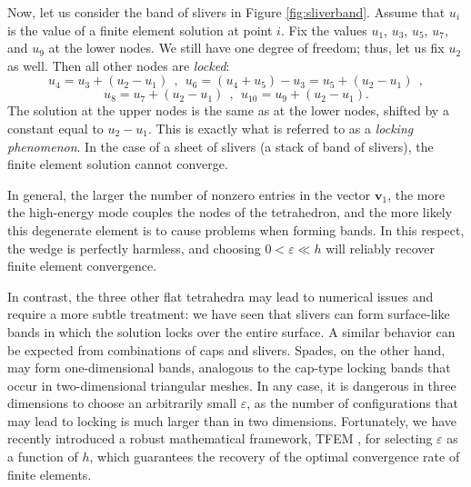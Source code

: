 \documentclass{article}
\begin{document}
Now, let us consider the band of slivers in Figure \ref{fig:sliverband}. Assume that $u_i$ is the value of a finite element solution at point $i$. Fix the values $u_1$, $u_3$, $u_5$, $u_7$, and $u_9$ at the lower nodes. We still have one degree of freedom; thus, let us fix $u_2$ as well. Then all other nodes are \emph{locked}:
$$u_4 = u_3+(u_2-u_1)~~,~~u_6 = (u_4+u_5)-u_3=u_5+(u_2-u_1)~~,$$
$$u_8 = u_7+(u_2-u_1)~~,~~u_{10} = u_9+(u_2-u_1).$$
The solution at the upper nodes is the same as at the lower nodes, shifted by a constant equal to $u_2-u_1$. This is exactly what is referred to as a \emph{locking phenomenon}. In the case of a sheet of slivers (a stack of band of slivers), the finite element solution cannot converge.

In general, the larger the number of nonzero entries in the vector \(\boldsymbol{v}_1\), 
the more the high-energy mode couples the nodes of the tetrahedron, 
and the more likely this degenerate element is to cause problems when forming bands. 
In this respect, the wedge is perfectly harmless, 
and choosing \(0 < \varepsilon \ll h\) will reliably recover finite element convergence. 

In contrast, the three other flat tetrahedra may lead to numerical issues 
and require a more subtle treatment: we have seen that slivers can form surface-like bands in which the solution locks over the entire surface. 
A similar behavior can be expected from combinations of caps and slivers. 
Spades, on the other hand, may form one-dimensional bands, 
analogous to the cap-type locking bands that occur in two-dimensional triangular meshes. In any case, it is dangerous in three dimensions to choose an arbitrarily small \(\varepsilon\),
as the number of configurations that may lead to locking is much larger than in two dimensions. Fortunately, we have recently introduced a robust mathematical framework, TFEM \cite{quiriny2024tempered},
for selecting \(\varepsilon\) as a function of \(h\), 
which guarantees the recovery of the optimal convergence rate of finite elements.
\end{document}
